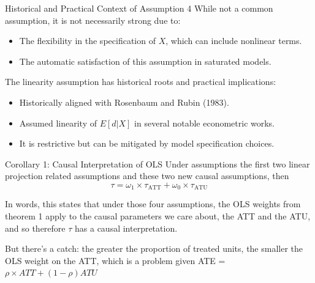 \begin{frame}{Historical and Practical Context of Assumption 4}
  While not a common assumption, it is not necessarily strong due to:
  \begin{itemize}
    \item The flexibility in the specification of \( X \), which can include nonlinear terms.
    \item The automatic satisfaction of this assumption in saturated models.
  \end{itemize}

    The linearity assumption has historical roots and practical implications:
    \begin{itemize}
      \item Historically aligned with Rosenbaum and Rubin (1983).
      \item Assumed linearity of \( E[d | X] \) in several notable econometric works.
      \item It is restrictive but can be mitigated by model specification choices.
    \end{itemize}
\end{frame}

\begin{frame}[shrink]{Corollary 1: Causal Interpretation of OLS}
  Under assumptions the first two linear projection related assumptions and these two new causal assumptions, then
  \[
    \tau = \omega_1 \times \tau_{\text{ATT}} + \omega_0 \times \tau_{\text{ATU}}
  \]
  
  In words, this states that under those four assumptions, the OLS weights from theorem 1 apply to the causal parameters we care about, the ATT and the ATU, and so therefore $\tau$ has a causal interpretation.  
  
  \bigskip
  
  But there's a catch: the greater the proportion of treated units, the smaller the OLS weight on the ATT, which is a problem given ATE = $\rho \times ATT + (1-\rho) ATU$
\end{frame}

